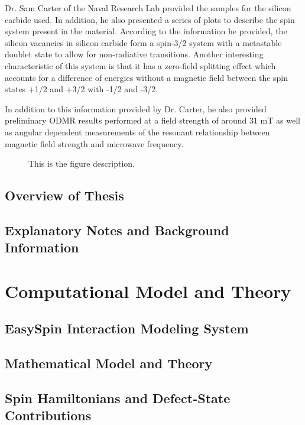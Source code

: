 \documentclass[oneside, astronomy, noacknowlegments]{BYUPhys}
\begin{document}
Dr. Sam Carter of the Naval Research Lab provided the samples for the silicon carbide used. In addition, he also presented a series of plots to describe the spin system present in the material. According to the information he provided, the silicon vacancies in silicon carbide form a spin-3/2 system with a metastable doublet state to allow for non-radiative transitions. Another interesting characteristic of this system is that it has a zero-field splitting effect which accounts for a difference of energies without a magnetic field between the spin states +1/2 and +3/2 with -1/2 and -3/2.

In addition to this information provided by Dr. Carter, he also provided preliminary ODMR results performed at a field strength of around 31 mT as well as angular dependent measurements of the resonant relationship between magnetic field strength and microwave frequency.

\begin{figure}
    \caption[Magnetic field and microwave frequency relationship]{\label{fig:MFRelationship}
     This is the figure description.}
 \end{figure}

\section{Overview of Thesis}

\section{Explanatory Notes and Background Information}

\chapter{Computational Model and Theory}

\section{EasySpin Interaction Modeling System}

\section{Mathematical Model and Theory}

\section{Spin Hamiltonians and Defect-State Contributions}
\end{document}

